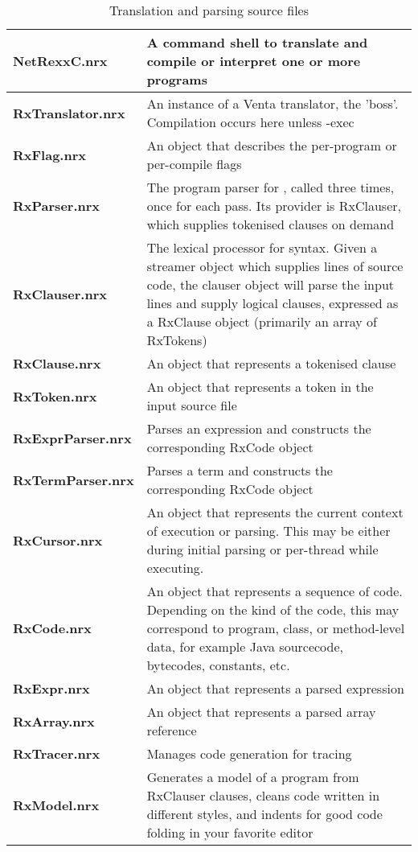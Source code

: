 \begin{table}\caption{Translation and parsing source files}
\begin{tabularx}{\textwidth}{>{\bfseries}lX}
    \toprule
    NetRexxC.nrx        &A command shell to translate and compile or interpret one or more \nr{} programs
    \\\midrule
    RxTranslator.nrx    &An instance of a Venta translator, the 'boss'. Compilation occurs here unless -exec
    \\\midrule
    RxFlag.nrx          &An object that describes the per-program or per-compile flags
    \\\midrule
    RxParser.nrx        &The program parser for \nr{}, called three times, once for each pass. Its provider
    is RxClauser, which supplies tokenised clauses on demand
    \\\midrule
    RxClauser.nrx       &The lexical processor for \nr{} syntax. Given a streamer object which supplies lines of source code,
    the clauser object will parse the input lines and supply logical \nr{} clauses,
    expressed as a RxClause object (primarily an array of RxTokens)
    \\\midrule
    RxClause.nrx        &An object that represents a tokenised clause
    \\\midrule
    RxToken.nrx         &An object that represents a token in the input source file
    \\\midrule
    RxExprParser.nrx    &Parses an expression and constructs the corresponding RxCode object
    \\\midrule
    RxTermParser.nrx    &Parses a term and constructs the corresponding RxCode object
    \\\midrule
    RxCursor.nrx        &An object that represents the current context of execution or parsing. This may be
    either during initial parsing or per-thread while executing.
    \\\midrule
    RxCode.nrx          &An object that represents a sequence of code. Depending on the kind of the code,
    this may correspond to program, class, or method-level data, for example Java sourcecode, bytecodes,
    constants, etc.
    \\\midrule
    RxExpr.nrx          &An object that represents a parsed expression
    \\\midrule
    RxArray.nrx         &An object that represents a parsed array reference
    \\\midrule
    RxTracer.nrx        &Manages code generation for tracing
    \\\midrule
    RxModel.nrx         &Generates a model of a \nr{} program from RxClauser clauses, cleans code written
    in different styles, and indents for good code folding in your favorite editor
    \\\bottomrule
\end{tabularx}
\end{table}


